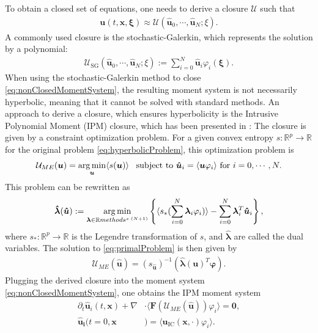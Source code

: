 To obtain a closed set of equations, one needs to derive a closure $\mathcal{U}$ such that 
\begin{align*}
\bm{u}(t,\bm x,\bm \xi) \approx \mathcal{U}(\bm{\hat u}_0,\cdots,\bm{\hat u}_N;\xi).
\end{align*}
A commonly used closure is the stochastic-Galerkin, which represents the solution by a polynomial:
\begin{align*}
\mathcal{U}_{\text{SG}}(\bm{\hat u}_0,\cdots,\bm{\hat u}_N;\xi):= \sum_{i=0}^N \bm{\hat{u}}_i\varphi_i(\bm{\xi}).
\end{align*}
When using the stochastic-Galerkin method to close \eqref{eq:nonClosedMomentSystem}, the resulting moment system is not necessarily hyperbolic, meaning that it cannot be solved with standard methods. An approach to derive a closure, which ensures hyperbolicity is the Intrusive Polynomial Moment (IPM) closure, which has been presented in \cite{poette2009uncertainty}: The closure is given by a constraint optimization problem. For a given convex entropy $s:\mathbb{R}^p\to\mathbb{R}$ for the original problem \eqref{eq:hyperbolicProblem}, this optimization problem is
\begin{align}\label{eq:primalProblem}
\mathcal{U}_{ME}(\bm{u}) = \operatorname*{arg\,min}_{\bm u} \langle s(\bm u) \rangle \enskip \text{ subject to } \bm{\hat u}_i = \langle \bm u \varphi_i \rangle \text{ for } i = 0,\cdots,N.
\end{align}
This problem can be rewritten as
\begin{align}\label{eq:dualProblem}
 \bm{\hat \lambda}(\bm{\hat u}) := \operatorname*{arg\,min}_{\bm{\lambda} \in \mathbb{R}methods^{s\cdot(N + 1)}}
  \left\{\langle s_*(\sum_{i=0}^{N}\bm{\lambda}_i \varphi_i)\rangle - \sum_{i=0}^{N}\bm{\lambda}_i^T \bm{\hat u}_i\right\},
\end{align}
where $s_*:\mathbb{R}^p\to\mathbb{R}$ is the Legendre transformation of $s$, and $\bm{ \hat\lambda}$ are called the dual variables. The solution to \eqref{eq:primalProblem} is then given by
\begin{align}\label{eq:ansatz}
 \mathcal{U}_{ME}(\bm{\hat u}) = \left( s_{\bm{\hat u}} \right)^{-1}(\bm{\hat{\lambda}}(\bm{u})^T \bm{\varphi}).
\end{align}
Plugging the derived closure into the moment system \eqref{eq:nonClosedMomentSystem}, one obtains the IPM moment system
\begin{subequations}\label{eq:IPMmomentSystem}
\begin{align}
\partial_t \bm{\hat u}_i(t,\bm{x}) + \nabla&\cdot\langle\bm{F}(\mathcal{U}_{ME}(\bm{\hat u})) \varphi_i\rangle = \bm{0}, \\
\bm{\hat u_i}(t=0,\bm{x}&) = \langle\bm{u}_{\text{IC}}(\bm{x},\cdot)\varphi_i\rangle.
\end{align}
\end{subequations}
